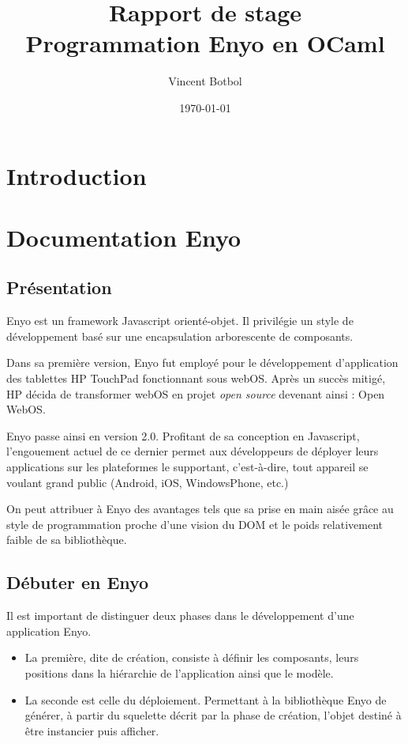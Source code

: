 \documentclass[11pt,a4paper]{report}
\title{Rapport de stage\\Programmation Enyo en OCaml}
\author{Vincent Botbol}
\date\today
\begin{document}
\maketitle
\tableofcontents

\chapter{Introduction}

\chapter{Documentation Enyo}
\section{Présentation}
Enyo est un framework Javascript orienté-objet. Il privilégie un style de développement basé
sur une encapsulation arborescente de composants.\medskip

Dans sa première version, Enyo fut employé pour le développement d'application des 
tablettes HP TouchPad fonctionnant sous webOS. Après un succès mitigé,
HP décida de transformer webOS en projet \emph{open source} devenant ainsi : Open WebOS.\medskip

Enyo passe ainsi en version 2.0. Profitant de sa conception en Javascript, 
l'engouement actuel de ce dernier permet aux développeurs de déployer leurs 
applications sur les plateformes le supportant, c'est-à-dire, tout appareil se voulant
grand public (Android, iOS, WindowsPhone, etc.)\medskip

On peut attribuer à Enyo des avantages tels que sa prise en main aisée grâce au style 
de programmation proche d'une vision du DOM et le poids relativement faible de sa bibliothèque.

\clearpage

\section{Débuter en Enyo}

Il est important de distinguer deux phases dans le développement d'une application 
Enyo.
\begin{itemize}
\item La première, dite de création, consiste à définir les composants, leurs positions dans 
la hiérarchie de l'application ainsi que le modèle. 
\item La seconde est celle du déploiement. Permettant à la bibliothèque Enyo de 
générer, à partir du squelette décrit par la phase de création, l'objet destiné
à être instancier puis afficher.
\end{itemize}\medskip
\end{document}
